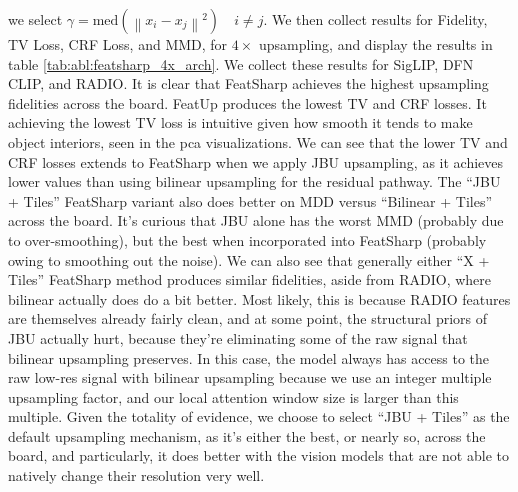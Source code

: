 we select $\gamma = \text{med}(\left\lVert x_i - x_j \right\rVert^2) \quad i \neq j$. We then collect results for Fidelity, TV Loss, CRF Loss, and MMD, for $4\times$ upsampling, and display the results in table \ref{tab:abl:featsharp_4x_arch}. We collect these results for SigLIP, DFN CLIP, and RADIO. It is clear that FeatSharp achieves the highest upsampling fidelities across the board. FeatUp produces the lowest TV and CRF losses. It achieving the lowest TV loss is intuitive given how smooth it tends to make object interiors, seen in the pca visualizations. We can see that the lower TV and CRF losses extends to FeatSharp when we apply JBU upsampling, as it achieves lower values than using bilinear upsampling for the residual pathway. The ``JBU + Tiles'' FeatSharp variant also does better on MDD versus ``Bilinear + Tiles'' across the board. It's curious that JBU alone has the worst MMD (probably due to over-smoothing), but the best when incorporated into FeatSharp (probably owing to smoothing out the noise). We can also see that generally either ``X + Tiles'' FeatSharp method produces similar fidelities, aside from RADIO, where bilinear actually does do a bit better. Most likely, this is because RADIO features are themselves already fairly clean, and at some point, the structural priors of JBU actually hurt, because they're eliminating some of the raw signal that bilinear upsampling preserves. In this case, the model always has access to the raw low-res signal with bilinear upsampling because we use an integer multiple upsampling factor, and our local attention window size is larger than this multiple. Given the totality of evidence, we choose to select ``JBU + Tiles'' as the default upsampling mechanism, as it's either the best, or nearly so, across the board, and particularly, it does better with the vision models that are not able to natively change their resolution very well.

